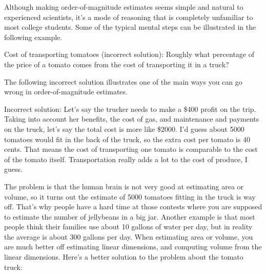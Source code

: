 Although making order-of-magnitude estimates seems simple
and natural to experienced scientists, it's a mode of
reasoning that is completely unfamiliar to most college
students. Some of the typical mental steps can be illustrated
in the following example.

\begin{exmp}
Cost of transporting tomatoes (incorrect solution):
Roughly what percentage of the price of a tomato
comes from the cost of transporting it in a truck?

The following incorrect solution illustrates one of the main
ways you can go wrong in order-of-magnitude estimates.

Incorrect solution: Let's say the trucker needs to make a
\$400 profit on the trip. Taking into account her benefits,
the cost of gas, and maintenance and payments on the truck,
let's say the total cost is more like \$2000. I'd guess
about 5000 tomatoes would fit in the back of the truck, so
the extra cost per tomato is 40 cents. That means the cost
of transporting one tomato is comparable to the cost of the
tomato itself. Transportation really adds a lot to the cost
of produce, I guess.
\end{exmp}
\divider
\vspace{2mm}

The problem is that the human brain is not very good at
estimating area or volume, so it turns out the estimate of
5000 tomatoes fitting in the truck is way off. That's why
people have a hard time at those contests where you are
supposed to estimate the number of jellybeans in a big jar.
Another example is that most people think their families use
about 10 gallons of water per day, but in reality the
average is about 300 gallons per day. When estimating area
or volume, you are much better off estimating linear
dimensions, and computing volume from the linear dimensions.
Here's a better solution to the problem about the tomato truck:



